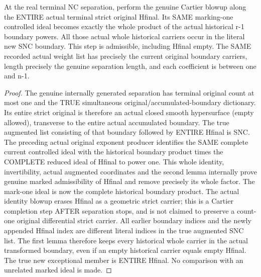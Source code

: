 \begin{theorem}
\label{hir:general-nc-completion-original-terminal-factor}
\leanok
At the real terminal NC separation, perform the genuine Cartier blowup along
the ENTIRE actual terminal strict original Hfinal. Its SAME marking-one
controlled ideal becomes exactly the whole product of the actual historical
r-1 boundary powers. All those actual whole historical carriers occur in the
literal new SNC boundary. This step is admissible, including Hfinal empty.
The SAME recorded actual weight list has precisely the current original
boundary carriers, length precisely the genuine separation length, and each
coefficient is between one and n-1.
\end{theorem}
\begin{proof}
The genuine internally generated separation has terminal original count at
most one and the TRUE simultaneous original/accumulated-boundary dictionary.
Its entire strict original is therefore an actual closed smooth hypersurface
(empty allowed), transverse to the entire actual accumulated boundary. The
true augmented list consisting of that boundary followed by ENTIRE Hfinal is
SNC. The preceding actual original exponent producer identifies the SAME
complete current controlled ideal with the historical boundary product times
the COMPLETE reduced ideal of Hfinal to power one. This whole identity,
invertibility, actual augmented coordinates and the second lemma internally
prove genuine marked admissibility of Hfinal and remove precisely its whole
factor. The mark-one ideal is now the complete historical boundary product.
The actual identity blowup erases Hfinal as a geometric strict carrier; this
is a Cartier completion step AFTER separation stops, and is not claimed to
preserve a count-one original differential strict carrier. All earlier
boundary indices and the newly appended Hfinal index are different literal
indices in the true augmented SNC list. The first lemma therefore keeps every
historical whole carrier in the actual transformed boundary, even if an
empty historical carrier equals empty Hfinal. The true new exceptional
member is ENTIRE Hfinal. No comparison with an unrelated marked ideal is made.
\end{proof}

